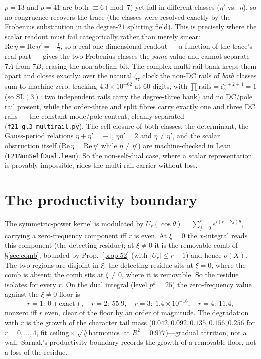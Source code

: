 \documentclass[11pt]{article}
\theoremstyle{definition}
\begin{document}
$p=13$ and $p=41$ are both $\equiv6\pmod7$ yet fall in different classes ($\eta'$ vs.\ $\eta$), so no congruence
recovers the trace (the classes were resolved exactly by the Frobenius substitution in the degree-$21$ splitting
field). This is precisely where the scalar readout must fail categorically rather than merely smear:
$\mathrm{Re}\,\eta=\mathrm{Re}\,\eta'=-\tfrac12$, so a real one-dimensional readout --- a function of the trace's
real part --- gives the two Frobenius classes the \emph{same} value and cannot separate $7A$ from $7B$, erasing
the non-abelian bit. The complex multi-rail bank keeps them apart and closes exactly: over the natural $\zeta_7$
clock the non-DC rails of \emph{both} classes sum to machine zero, tracking $4.3\times10^{-62}$ at $60$ digits,
with $\prod\text{rails}=\zeta_7^{1+2+4}=1$ (so $\mathrm{SL}(3)$: two independent rails carry the degree-three
bank) and no DC/pole rail present, while the order-three and split fibres carry exactly one and three DC rails ---
the constant-mode/pole content, cleanly separated (\texttt{f21\_gl3\_multirail.py}). The cell closure of both
classes, the determinant, the Gauss-period relations $\eta+\eta'=-1$, $\eta\eta'=2$ and $\eta\ne\eta'$, and the
scalar obstruction itself ($\mathrm{Re}\,\eta=\mathrm{Re}\,\eta'$ while $\eta\ne\eta'$) are machine-checked in Lean
(\texttt{F21NonSelfDual.lean}). So the non-self-dual case, where a scalar representation is provably impossible, rides the
multi-rail carrier without loss.

\section{The productivity boundary}\label{sec:sarnak}

The symmetric-power kernel is modulated by $U_r(\cos\theta)=\sum_{j=0}^r e^{i(r-2j)\theta}$, carrying
a zero-frequency component iff $r$ is even. At $\xi=0$ the $x$-integral reads this component (the
detecting residue); at $\xi\neq0$ it is the removable comb of \S\ref{sec:comb}, bounded by
Prop.~\ref{prop:52} (with $|U_r|\le r+1$) and hence $o(X)$. The two regions are disjoint in $\xi$:
the detecting residue sits at $\xi=0$, where the comb is absent; the comb sits at $\xi\neq0$, where it
is removable. So the residue isolates for every $r$. On the dual integral (level $p^k=25$) the
zero-frequency value against the $\xi\neq0$ floor is
\[
  r=1:\ 0\ (\text{exact}),\quad r=2:\ 55.9,\quad r=3:\ 1.4\times10^{-16},\quad r=4:\ 11.4,
\]
nonzero iff $r$ even, clear of the floor by an order of magnitude. The degradation with $r$ is the
growth of the character tail mass ($0.042,0.092,0.135,0.156,0.256$ for $r=0,\dots,4$, fit
$\text{ceiling}\times\sqrt{\#\text{harmonics}}$ at $R^2=0.977$)---gradual attrition, not a wall.
Sarnak's productivity boundary \cite[fn.~5]{AltIII} records the growth of a removable floor, not a
loss of the residue.
\end{document}
